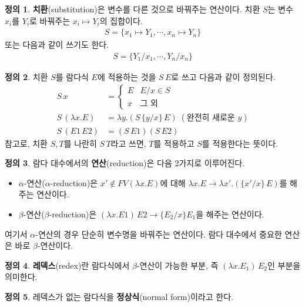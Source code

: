 \documentclass[b5paper, 10pt]{book}
\theoremstyle{definition}
\newtheorem{defn}{정의}[chapter]
\begin{document}
\begin{defn}
    \textbf{치환}(substitution)은 변수를 다른 것으로 바꿔주는 연산이다. 치환 $S$는 변수 $x_i$를
    $Y_i$로 바꿔주는 $x_i \mapsto Y_i$의 집합이다.
    \begin{align*}
        S = \{ x_1 \mapsto Y_1, \cdots, x_n \mapsto Y_n\}
    \end{align*}
    또는 다음과 같이 쓰기도 한다.
    \begin{align*}
        S = \{ Y_1 / x_1, \cdots, Y_n / x_n \}
    \end{align*}
\end{defn}
\begin{defn}
    치환 $S$를 람다식 $E$에 적용하는 것을 $S \, E$로 쓰고 다음과 같이 정의된다.
    \begin{align*}
        S \, x &= 
            \begin{cases}
                E & E/x \in S \\
                x & \text{그 외} 
            \end{cases}  \\ 
        S \, (\lambda x. E) &= 
        \lambda y. (S \, \{ y/x\} \, E) \; (\text{완전히 새로운 } y) \\ 
        S \, (E1 \, E2) &= (S \, E1) (S \, E2) 
    \end{align*} 
    참고로, 치환 $S, T$를 나란히 $S \, T$라고 쓰면, $T$를 적용하고 $S$를 적용한다는 뜻이다.
\end{defn}
\begin{defn}
    람다 대수에서의 \textbf{연산}(reduction)은 다음 2가지로 이루어진다.
    \begin{itemize}
        \item $\alpha$-연산($\alpha$-reduction)은 
        $x' \notin FV(\lambda x. E)$에 대해 
        $\lambda x. E \rightarrow \lambda x'. (\{x'/x\} \, E)$를 해주는 연산이다.
        \item $\beta$-연산($\beta$-reduction)은
        $(\lambda x. E1) \, E2 \rightarrow \{ E_2 / x\}E_1$을 해주는 연산이다.
    \end{itemize}
\end{defn}
여기서 $\alpha$-연산의 경우 단순히 변수명을 바꿔주는 연산이다. 람다 대수에서 
중요한 연산은 바로 $\beta$-연산이다. 
\begin{defn}
    \textbf{레덱스}(redex)란 람다식에서 $\beta$-연산이 가능한 부분, 즉 
    $( \lambda x. E_1 ) \, E_2$인 부분을 의미한다.
\end{defn}
\begin{defn}
    레덱스가 없는 람다식을 \textbf{정상식}(normal form)이라고 한다.
\end{defn}
\end{document}
